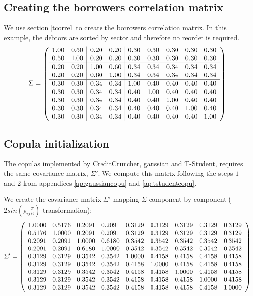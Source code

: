 \documentclass[a4paper,12pt,final]{article}
\begin{document}
\clearpage 

\subsection{Creating the borrowers correlation matrix}

We use section \ref{tcorrel} to create the borrowers correlation matrix. In 
this example, the debtors are sorted by sector and therefore no reorder is 
required.
\begin{displaymath}
\Sigma = 
\left( 
\begin{array}{cc|cc|ccccc}
 1.00 & 0.50 & 0.20 & 0.20 & 0.30 & 0.30 & 0.30 & 0.30 & 0.30 \cr
 0.50 & 1.00 & 0.20 & 0.20 & 0.30 & 0.30 & 0.30 & 0.30 & 0.30 \cr
\hline
 0.20 & 0.20 & 1.00 & 0.60 & 0.34 & 0.34 & 0.34 & 0.34 & 0.34 \cr
 0.20 & 0.20 & 0.60 & 1.00 & 0.34 & 0.34 & 0.34 & 0.34 & 0.34 \cr
\hline
 0.30 & 0.30 & 0.34 & 0.34 & 1.00 & 0.40 & 0.40 & 0.40 & 0.40 \cr
 0.30 & 0.30 & 0.34 & 0.34 & 0.40 & 1.00 & 0.40 & 0.40 & 0.40 \cr
 0.30 & 0.30 & 0.34 & 0.34 & 0.40 & 0.40 & 1.00 & 0.40 & 0.40 \cr
 0.30 & 0.30 & 0.34 & 0.34 & 0.40 & 0.40 & 0.40 & 1.00 & 0.40 \cr
 0.30 & 0.30 & 0.34 & 0.34 & 0.40 & 0.40 & 0.40 & 0.40 & 1.00 \cr
\end{array}
\right)
\end{displaymath}

\subsection{Copula initialization}

The copulas implemented by CreditCruncher, gaussian and T-Student, 
requires the same covariance matrix, $\Sigma'$. We compute this matrix
following the steps $1$ and $2$ from appendices \ref{ap:gaussiancopu} 
and \ref{ap:tstudentcopu}.
\newline

We create the covariance matrix $\Sigma'$ mapping $\Sigma$ component 
by component ($2 sin(\rho_{ij} \frac{\pi}{6})$ transformation):
{\small
\begin{displaymath}
\Sigma' = 
\left( 
\begin{array}{ccccccccc}
   1.0000 & 0.5176 & 0.2091 & 0.2091 & 0.3129 & 0.3129 & 0.3129 & 0.3129 & 0.3129 \cr
   0.5176 & 1.0000 & 0.2091 & 0.2091 & 0.3129 & 0.3129 & 0.3129 & 0.3129 & 0.3129 \cr
   0.2091 & 0.2091 & 1.0000 & 0.6180 & 0.3542 & 0.3542 & 0.3542 & 0.3542 & 0.3542 \cr
   0.2091 & 0.2091 & 0.6180 & 1.0000 & 0.3542 & 0.3542 & 0.3542 & 0.3542 & 0.3542 \cr
   0.3129 & 0.3129 & 0.3542 & 0.3542 & 1.0000 & 0.4158 & 0.4158 & 0.4158 & 0.4158 \cr
   0.3129 & 0.3129 & 0.3542 & 0.3542 & 0.4158 & 1.0000 & 0.4158 & 0.4158 & 0.4158 \cr
   0.3129 & 0.3129 & 0.3542 & 0.3542 & 0.4158 & 0.4158 & 1.0000 & 0.4158 & 0.4158 \cr
   0.3129 & 0.3129 & 0.3542 & 0.3542 & 0.4158 & 0.4158 & 0.4158 & 1.0000 & 0.4158 \cr
   0.3129 & 0.3129 & 0.3542 & 0.3542 & 0.4158 & 0.4158 & 0.4158 & 0.4158 & 1.0000 \cr
\end{array}
\right)
\end{displaymath}
}
\end{document}
